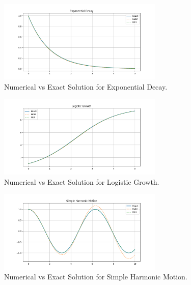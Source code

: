 \documentclass{article}
\begin{document}
\begin{center}
    \begin{figure}[htbp]
        \centering
        \includegraphics[width=0.7\textwidth]{results/figures/exponential_decay.png}
        \caption{Numerical vs Exact Solution for Exponential Decay.}
        \label{fig:exp_decay}
    \end{figure}
    
    \begin{figure}[htbp]
        \centering
        \includegraphics[width=0.7\textwidth]{results/figures/logistic_growth.png}
        \caption{Numerical vs Exact Solution for Logistic Growth.}
        \label{fig:logistic_growth}
    \end{figure}
    
    \begin{figure}[htbp]
        \centering
        \includegraphics[width=0.7\textwidth]{results/figures/shm.png}
        \caption{Numerical vs Exact Solution for Simple Harmonic Motion.}
        \label{fig:shm}
    \end{figure}
    

\end{center}
\end{document}
